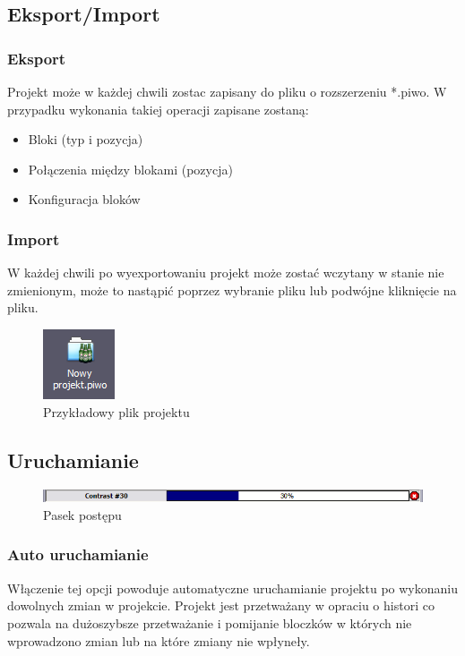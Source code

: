 \documentclass[a4paper,10pt]{article}
\begin{document}
\subsection{Eksport/Import}
\subsubsection{Eksport}
Projekt może w każdej chwili zostac zapisany do pliku o rozszerzeniu *.piwo. W przypadku wykonania takiej operacji zapisane zostaną:
\begin{itemize}
 \item Bloki (typ i pozycja)
 \item Połączenia między blokami (pozycja)
 \item Konfiguracja bloków 
\end{itemize}
\subsubsection{Import}
W każdej chwili po wyexportowaniu projekt może zostać wczytany w stanie nie zmienionym, może to nastąpić poprzez wybranie pliku lub podwójne kliknięcie na pliku.
\begin{figure}[ht]
 \centering
 \includegraphics[scale=1.0]{plik.png}
 \caption{Przykładowy plik projektu}
 \label{fig:plik}
\end{figure} 

\subsection{Uruchamianie}
\begin{figure}[ht]
 \centering
 \includegraphics[scale=0.5]{pasek.png}
 \caption{Pasek postępu}
 \label{fig:pasek}
\end{figure} 
\subsubsection{Auto uruchamianie}
Włączenie tej opcji powoduje automatyczne uruchamianie projektu po wykonaniu dowolnych zmian w projekcie. Projekt jest przetważany w opraciu o histori co pozwala na dużoszybsze przetważanie i pomijanie bloczków w których nie wprowadzono zmian lub na które zmiany nie wpłyneły.
\end{document}

